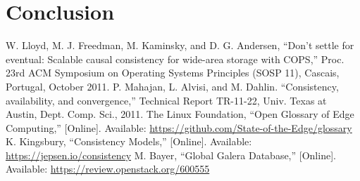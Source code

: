 \documentclass[conference]{IEEEtran}
\begin{document}
\section{Conclusion}

\begin{thebibliography}{00}
 W. Lloyd, M. J. Freedman, M. Kaminsky, and D. G. Andersen, ``Don’t settle for eventual: Scalable causal consistency for wide-area storage with COPS,'' Proc. 23rd ACM Symposium on Operating Systems Principles (SOSP 11), Cascais, Portugal, October 2011.
 P. Mahajan, L. Alvisi, and M. Dahlin. ``Consistency, availability, and convergence,'' Technical Report TR-11-22, Univ. Texas at Austin, Dept. Comp. Sci., 2011.
 The Linux Foundation, ``Open Glossary of Edge Computing,'' [Online]. Available: \url{https://github.com/State-of-the-Edge/glossary}
 K. Kingsbury, ``Consistency Models,'' [Online]. Available: \url{https://jepsen.io/consistency}
 M. Bayer, ``Global Galera Database,'' [Online]. Available: \url{https://review.openstack.org/600555}
\end{thebibliography}
\end{document}
